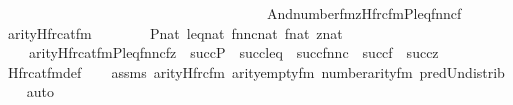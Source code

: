 \begin{isabellebody}
\ \ \ \ \ \ \ \ \ \ \ \ \ \ \ \ \ \ \ \ \ \ \ \ \ \ \ \ \ \ \ \ \ \ \ \ \ \ And{\isacharparenleft}{\kern0pt}number{}{\isacharunderscore}{\kern0pt}fm{\isacharparenleft}{\kern0pt}z{\isacharparenright}{\kern0pt}{\isacharcomma}{\kern0pt}Hfrc{\isacharunderscore}{\kern0pt}fm{\isacharparenleft}{\kern0pt}P{\isacharcomma}{\kern0pt}leq{\isacharcomma}{\kern0pt}fnnc{\isacharcomma}{\kern0pt}f{\isacharparenright}{\kern0pt}{\isacharparenright}{\kern0pt}{\isacharparenright}{\kern0pt}{\isachardoublequoteclose}\isanewline
\isanewline
{}\isamarkupfalse%
\ arity{\isacharunderscore}{\kern0pt}Hfrc{\isacharunderscore}{\kern0pt}at{\isacharunderscore}{\kern0pt}fm\ {\isacharcolon}{\kern0pt}\isanewline
\ \ \isanewline
\ \ \ \ {\isachardoublequoteopen}P{\isasymin}nat{\isachardoublequoteclose}\ {\isachardoublequoteopen}leq{\isasymin}nat{\isachardoublequoteclose}\ {\isachardoublequoteopen}fnnc{\isasymin}nat{\isachardoublequoteclose}\ {\isachardoublequoteopen}f{\isasymin}nat{\isachardoublequoteclose}\ {\isachardoublequoteopen}z{\isasymin}nat{\isachardoublequoteclose}\isanewline
\ \ \isanewline
\ \ \ \ {\isachardoublequoteopen}arity{\isacharparenleft}{\kern0pt}Hfrc{\isacharunderscore}{\kern0pt}at{\isacharunderscore}{\kern0pt}fm{\isacharparenleft}{\kern0pt}P{\isacharcomma}{\kern0pt}leq{\isacharcomma}{\kern0pt}fnnc{\isacharcomma}{\kern0pt}f{\isacharcomma}{\kern0pt}z{\isacharparenright}{\kern0pt}{\isacharparenright}{\kern0pt}\ {\isacharequal}{\kern0pt}\ succ{\isacharparenleft}{\kern0pt}P{\isacharparenright}{\kern0pt}\ {\isasymunion}\ succ{\isacharparenleft}{\kern0pt}leq{\isacharparenright}{\kern0pt}\ {\isasymunion}\ succ{\isacharparenleft}{\kern0pt}fnnc{\isacharparenright}{\kern0pt}\ {\isasymunion}\ succ{\isacharparenleft}{\kern0pt}f{\isacharparenright}{\kern0pt}\ {\isasymunion}\ succ{\isacharparenleft}{\kern0pt}z{\isacharparenright}{\kern0pt}{\isachardoublequoteclose}\isanewline
%
\isadelimproof
\ \ %
\endisadelimproof
%
\isatagproof
{}\isamarkupfalse%
\ Hfrc{\isacharunderscore}{\kern0pt}at{\isacharunderscore}{\kern0pt}fm{\isacharunderscore}{\kern0pt}def\isanewline
\ \ \isamarkupfalse%
\ assms\ arity{\isacharunderscore}{\kern0pt}Hfrc{\isacharunderscore}{\kern0pt}fm\ arity{\isacharunderscore}{\kern0pt}empty{\isacharunderscore}{\kern0pt}fm\ number{}arity{\isacharunderscore}{\kern0pt}{\isacharunderscore}{\kern0pt}fm\ pred{\isacharunderscore}{\kern0pt}Un{\isacharunderscore}{\kern0pt}distrib\isanewline
\ \ \isamarkupfalse%
\ auto%
\endisatagproof
{\isafoldproof}%

\end{isabellebody}

